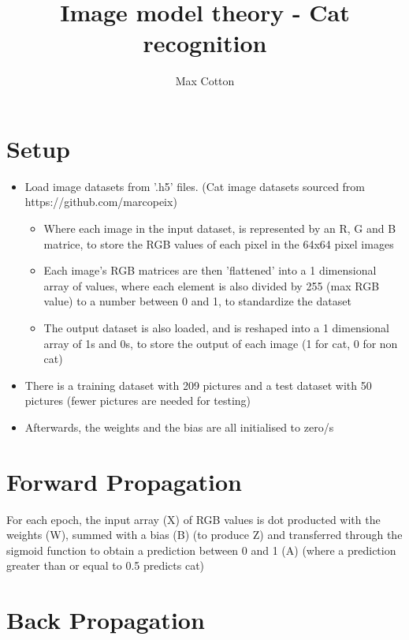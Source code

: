 \documentclass[10pt,a4paper]{article}
\title{Image model theory - Cat recognition}
\author{Max Cotton}
\date{}
\begin{document}
\maketitle

\section{Setup}

\begin{itemize}
    \item Load image datasets from '.h5' files. (Cat image datasets sourced from https://github.com/marcopeix)
    \begin{itemize}
        \item Where each image in the input dataset, is represented by an R, G and B matrice, to store the RGB values of each pixel in the 64x64 pixel images
        \item Each image's RGB matrices are then 'flattened' into a 1 dimensional array of values, where each element is also divided by 255 (max RGB value) to a number between 0 and 1, to standardize the dataset
        \item The output dataset is also loaded, and is reshaped into a 1 dimensional array of 1s and 0s, to store the output of each image (1 for cat, 0 for non cat)
    \end{itemize}
    \item There is a training dataset with 209 pictures and a test dataset with 50 pictures (fewer pictures are needed for testing)
    \item Afterwards, the weights and the bias are all initialised to zero/s
\end{itemize}

\section{Forward Propagation}
For each epoch, the input array (X) of RGB values is dot producted with the weights (W), summed with a bias (B) (to produce Z) and transferred through the sigmoid function to obtain a prediction between 0 and 1 (A) (where a prediction greater than or equal to 0.5 predicts cat)

\section{Back Propagation}
\end{document}

